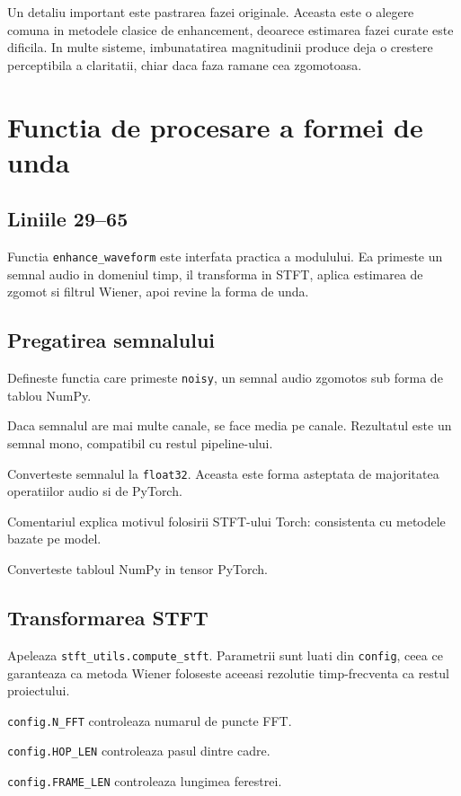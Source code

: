 \documentclass[12pt,a4paper]{report}
\newcommand{\codechunk}[2]{
    
}
\begin{document}
Un detaliu important este pastrarea fazei originale. Aceasta este o alegere comuna in metodele clasice de enhancement, deoarece estimarea fazei curate este dificila. In multe sisteme, imbunatatirea magnitudinii produce deja o crestere perceptibila a claritatii, chiar daca faza ramane cea zgomotoasa.

\chapter{Functia de procesare a formei de unda}

\section{Liniile 29--65}

\codechunk{29}{65}

Functia \texttt{enhance\_waveform} este interfata practica a modulului. Ea primeste un semnal audio in domeniul timp, il transforma in STFT, aplica estimarea de zgomot si filtrul Wiener, apoi revine la forma de unda.

\section{Pregatirea semnalului}

\begin{description}[leftmargin=2.8cm,style=nextline]
    \item[Linia 29] Defineste functia care primeste \texttt{noisy}, un semnal audio zgomotos sub forma de tablou NumPy.
    \item[Liniile 30--31] Daca semnalul are mai multe canale, se face media pe canale. Rezultatul este un semnal mono, compatibil cu restul pipeline-ului.
    \item[Linia 32] Converteste semnalul la \texttt{float32}. Aceasta este forma asteptata de majoritatea operatiilor audio si de PyTorch.
    \item[Linia 34] Comentariul explica motivul folosirii STFT-ului Torch: consistenta cu metodele bazate pe model.
    \item[Linia 35] Converteste tabloul NumPy in tensor PyTorch.
\end{description}

\section{Transformarea STFT}

\begin{description}[leftmargin=2.8cm,style=nextline]
    \item[Liniile 36--41] Apeleaza \texttt{stft\_utils.compute\_stft}. Parametrii sunt luati din \texttt{config}, ceea ce garanteaza ca metoda Wiener foloseste aceeasi rezolutie timp-frecventa ca restul proiectului.
    \item[Linia 38] \texttt{config.N\_FFT} controleaza numarul de puncte FFT.
    \item[Linia 39] \texttt{config.HOP\_LEN} controleaza pasul dintre cadre.
    \item[Linia 40] \texttt{config.FRAME\_LEN} controleaza lungimea ferestrei.
\end{description}
\end{document}
